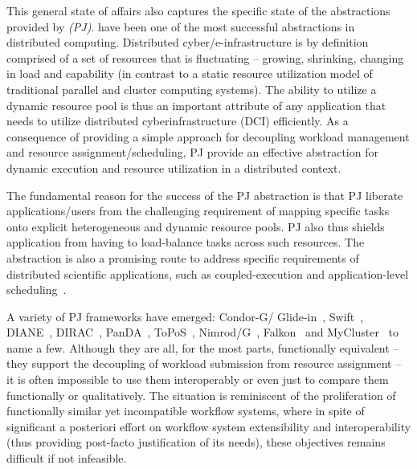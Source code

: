 \documentclass[conference]{IEEEtran}
\begin{document}

This general state of affairs also captures the specific state of the
abstractions provided by {\it \pilotjobs (PJ)}. \pilotjobs have been
one of the most successful abstractions in distributed
computing. Distributed cyber/e-infrastructure is by definition
comprised of a set of resources that is fluctuating -- growing,
shrinking, changing in load and capability (in contrast to a static
resource utilization model of traditional parallel
and cluster computing systems).  The ability to utilize a dynamic resource
pool is thus an important attribute of any application that needs to
utilize distributed cyberinfrastructure (DCI) efficiently. As a
consequence of providing a simple approach for decoupling workload
management and resource assignment/scheduling, PJ provide an
effective abstraction for dynamic execution and resource utilization in
a distributed context.


The fundamental reason for the success of the PJ abstraction is that
PJ liberate applications/users from the challenging requirement of
mapping specific tasks onto explicit heterogeneous and dynamic
resource pools.  PJ also thus shields application from having to
load-balance tasks across such resources.  The \pilotjob abstraction
is also a promising route to address specific requirements of
distributed scientific applications, such as coupled-execution and
application-level scheduling~\cite{ko-efficient,DBLP:conf/hpdc/KimHMAJ10}.


A variety of PJ frameworks have emerged:
Condor-G/ Glide-in~\cite{condor-g}, Swift~\cite{Wilde2011},
DIANE~\cite{Moscicki:908910}, DIRAC~\cite{1742-6596-219-6-062049},
PanDA~\cite{1742-6596-219-6-062041}, ToPoS~\cite{topos},
Nimrod/G~\cite{10.1109/HPC.2000.846563}, Falkon~\cite{1362680} and
MyCluster~\cite{1652061} to name a few. Although they are all, for the
most parts, functionally equivalent -- they support the decoupling of
workload submission from resource assignment -- it is often impossible
to use them interoperably or even just to compare them functionally or
qualitatively.  The situation is reminiscent of the proliferation of
functionally similar yet incompatible workflow systems, where in spite
of significant a posteriori effort on workflow system extensibility
and interoperability (thus providing post-facto justification of its
needs), these objectives remains difficult if not infeasible.
\end{document}
